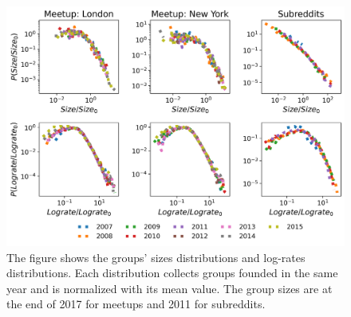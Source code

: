 








\begin{figure}[h]
	\centering
	\includegraphics[width=0.8\linewidth]{Figures/figures/Fig1.png}
	\caption{The figure shows the groups' sizes distributions and log-rates distributions. Each distribution collects groups founded in the same year and is normalized with its mean value. The group sizes are at the end of 2017 for meetups and 2011 for subreddits. }
	\label{fig:scale}
\end{figure}



